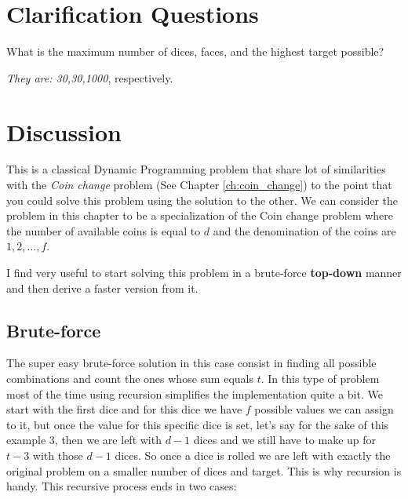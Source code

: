 \section{Clarification Questions}

\begin{QandA}
	\item What is the maximum number of dices, faces, and the highest target possible?
	\begin{answered}
		\textit{They are: 30,30,1000}, respectively.
	\end{answered}
	
\end{QandA}

\section{Discussion}
\label{dice_rolls:sec:discussion}

This is a classical Dynamic Programming problem that share lot of similarities with the \textit{Coin change} problem (See Chapter \ref{ch:coin_change}) to the point that you could solve this problem using the solution to the other. We can consider the problem in this chapter to be a specialization of the Coin change problem where the number of available coins is equal to $d$ and the denomination of the coins are $1,2,\ldots,f$.

I find very useful to start solving this problem in a brute-force \textbf{top-down} manner and then derive a faster version from it. 

\subsection{Brute-force}
\label{dice_rolls:sec:bruteforce}
The super easy brute-force solution in this case consist in finding all possible combinations and count the ones whose sum equals $t$. In this type of problem most of the time using recursion simplifies the implementation quite a bit. 
We start with the first dice and for this dice we have $f$ possible values we can assign to it, but once the value for this specific dice is set, let's say for the sake of this example $3$, then we are left with $d-1$ dices and we still have to make up for $t-3$  with those $d-1$ dices. So once a dice is rolled we are left with exactly the original problem on a smaller number of dices and target. This is why recursion is handy. This recursive process ends in two cases:

